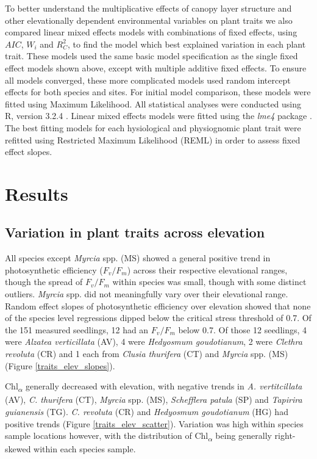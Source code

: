 \documentclass[a4paper, 11pt]{article}
\begin{document}
To better understand the multiplicative effects of canopy layer structure and other elevationally dependent environmental variables on plant traits we also compared linear mixed effects models with combinations of fixed effects, using $AIC$, $W_i$ and $R_C^2$, to find the model which best explained variation in each plant trait. These models used the same basic model specification as the single fixed effect models shown above, except with multiple additive fixed effects. To ensure all models converged, these more complicated models used random intercept effects for both species and sites. For initial model comparison, these models were fitted using Maximum Likelihood. All statistical analyses were conducted using R, version 3.2.4 \citep{R2019}. Linear mixed effects models were fitted using the \textit{lme4} package \citep{Bates2015}. The best fitting models for each hysiological and physiognomic plant trait were refitted using Restricted Maximum Likelihood (REML) in order to assess fixed effect slopes.

\section{Results}

\subsection{Variation in plant traits across elevation}

All species except \textit{Myrcia} spp. (MS) showed a general positive trend in photosynthetic efficiency ($F_v/F_m$) across their respective elevational ranges, though the spread of $F_v/F_m$ within species was small, though with some distinct outliers. \textit{Myrcia} spp. did not meaningfully vary over their elevational range. Random effect slopes of photosynthetic efficiency over elevation showed that none of the species level regressions dipped below the critical stress threshold of 0.7. Of the 151 measured seedlings, 12 had an $F_v/F_m$ below 0.7. Of those 12 seedlings, 4 were \textit{Alzatea verticillata} (AV), 4 were \textit{Hedyosmum goudotianum}, 2 were  \textit{Clethra revoluta} (CR) and 1 each from \textit{Clusia thurifera} (CT) and \textit{Myrcia} spp. (MS) (Figure \ref{traits_elev_slopes}). 

Chl\textsubscript{$\alpha$} generally decreased with elevation, with negative trends in \textit{A. vertitcillata} (AV), \textit{C. thurifera} (CT), \textit{Myrcia} spp. (MS), \textit{Schefflera patula} (SP) and \textit{Tapirira guianensis} (TG). \textit{C. revoluta} (CR)  and \textit{Hedyosmum goudotianum} (HG) had positive trends (Figure \ref{traits_elev_scatter}). Variation was high within species sample locations however, with the distribution of Chl\textsubscript{$\alpha$} being generally right-skewed within each species sample.
\end{document}
